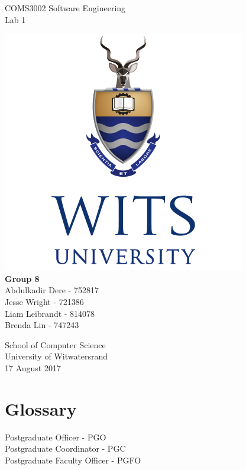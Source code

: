\documentclass{article}
\begin{document}
\begin{titlepage}
    \begin{center}
        \vspace*{1cm}
        \huge COMS3002 Software Engineering \\
        \LARGE Lab 1
        
		\vspace{1.5cm}        
		
		\includegraphics[scale=0.5]{witsLogo.png} \\		
		\vspace{1.5cm}
        \textbf{Group 8} \\
        \large Abdulkadir Dere - 752817\\
        Jesse Wright - 721386 \\
        Liam Leibrandt - 814078\\
        Brenda Lin - 747243 \\
        
		\vspace{1.5cm} 
		       
                
        School of Computer Science\\
        University of Witwatersrand\\
        17 August 2017
        
    \end{center}
\end{titlepage}

\section*{Glossary}
Postgraduate Officer - PGO \\
Postgraduate Coordinator - PGC  \\
Postgraduate Faculty Officer - PGFO  \\
\end{document}
